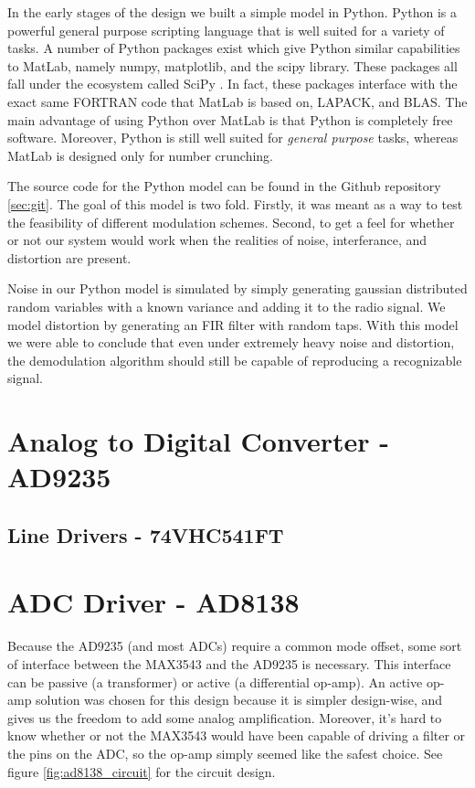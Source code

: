 \documentclass[a4paper, 12pt, notitlepage]{article}
\begin{document}
In the early stages of the design we built a simple model in Python.  Python is a powerful general purpose scripting language that is well suited for a variety of tasks.  A number of Python packages exist which give Python similar capabilities to MatLab, namely numpy, matplotlib, and the scipy library.  These packages all fall under the ecosystem called SciPy \cite{scipy}.  In fact, these packages interface with the exact same FORTRAN code that MatLab is based on, LAPACK\cite{lapack}, and BLAS\cite{blas}.  The main advantage of using Python over MatLab is that Python is completely free software.  Moreover, Python is still well suited for \textit{general purpose} tasks, whereas MatLab is designed only for number crunching.

The source code for the Python model can be found in the Github repository \ref{sec:git}.  The goal of this model is two fold.  Firstly, it was meant as a way to test the feasibility of different modulation schemes.  Second, to get a feel for whether or not our system would work when the realities of noise, interferance, and distortion are present.

Noise in our Python model is simulated by simply generating gaussian distributed random variables with a known variance and adding it to the radio signal.  We model distortion by generating an FIR filter with random taps.  With this model we were able to conclude that even under extremely heavy noise and distortion, the demodulation algorithm should still be capable of reproducing a recognizable signal.

\section{Analog to Digital Converter - AD9235}
\subsection{Line Drivers - 74VHC541FT}

\section{ADC Driver - AD8138}
Because the AD9235 (and most ADCs) require a common mode offset, some sort of interface between the MAX3543 and the AD9235 is necessary.  This interface can be passive (a transformer) or active (a differential op-amp).  An active op-amp solution was chosen for this design because it is simpler design-wise, and gives us the freedom to add some analog amplification.  Moreover, it's hard to know whether or not the MAX3543 would have been capable of driving a filter or the pins on the ADC, so the op-amp simply seemed like the safest choice.  See figure \ref{fig:ad8138_circuit} for the circuit design.
\end{document}
